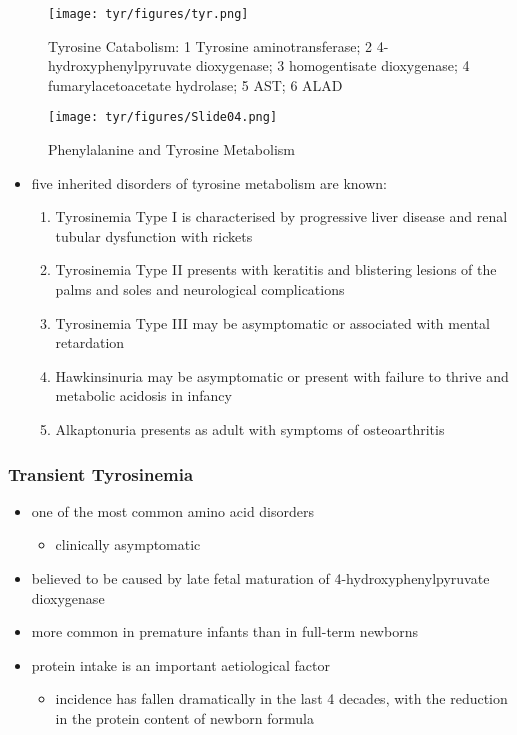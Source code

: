 \documentclass[12pt]{scrartcl}
\begin{document}
\begin{figure}[htbp]
\centering
\texttt{[image: tyr/figures/tyr.png]}
\caption{\label{fig:org811c3b0}Tyrosine Catabolism: 1 Tyrosine aminotransferase; 2 4-hydroxyphenylpyruvate dioxygenase; 3 homogentisate dioxygenase; 4 fumarylacetoacetate hydrolase; 5 AST; 6 ALAD}
\end{figure}


\begin{figure}[htbp]
\centering
\texttt{[image: tyr/figures/Slide04.png]}
\caption{\label{fig:org9416768}Phenylalanine and Tyrosine Metabolism}
\end{figure}

\begin{itemize}
\item five inherited disorders of tyrosine metabolism are known:
\begin{enumerate}
\item Tyrosinemia Type I is characterised by progressive
liver disease and renal tubular dysfunction with rickets
\item Tyrosinemia Type II presents with keratitis and
blistering lesions of the palms and soles and neurological
complications
\item Tyrosinemia Type III may be asymptomatic or associated with
mental retardation
\item Hawkinsinuria may be asymptomatic or present with failure to
thrive and metabolic acidosis in infancy
\item Alkaptonuria presents as adult with symptoms of osteoarthritis
\end{enumerate}
\end{itemize}

\subsubsection{Transient Tyrosinemia}
\label{sec:org79331a3}
\begin{itemize}
\item one of the most common amino acid disorders
\begin{itemize}
\item clinically asymptomatic
\end{itemize}
\item believed to be caused by late fetal maturation of
4-hydroxyphenylpyruvate dioxygenase
\item more common in premature infants than in full-term newborns
\item protein intake is an important aetiological factor
\begin{itemize}
\item incidence has fallen dramatically in the last 4 decades, with the
reduction in the protein content of newborn formula
\end{itemize}
\end{itemize}
\end{document}
